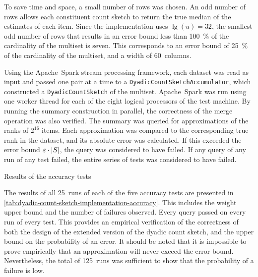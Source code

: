 To save time and space, a small number of rows was chosen.
An odd number of rows allows each constituent count sketch to return the true median of the estimates of each item.
Since the implementation uses \( \lg (u) = 32 \), the smallest odd number of rows that results in an error bound less than \SI{100}{\percent} of the cardinality of the multiset is seven.
This corresponds to an error bound of \SI{25}{\percent} of the cardinality of the multiset, and a width of \num{60}~columns.

Using the Apache~Spark stream processing framework, each dataset was read as input and passed one pair at a time to a \lstinline{DyadicCountSketchAccumulator}, which constructed a \lstinline{DyadicCountSketch} of the multiset.
Apache~Spark was run using one worker thread for each of the eight logical processors of the test machine.
By running the summary construction in parallel, the correctness of the merge operation was also verified.
The summary was queried for approximations of the ranks of \( 2^{16} \) items.
Each approximation was compared to the corresponding true rank in the dataset, and its absolute error was calculated.
If this exceeded the error bound \( \varepsilon \cdot \lvert S\rvert \), the query was considered to have failed.
If any query of any run of any test failed, the entire series of tests was considered to have failed.

\begin{table}
  \centering
  \caption{Results of the accuracy tests}
  \label{tab:dyadic-count-sketch-implementation-accuracy}
\end{table}

The results of all \num{25}~runs of each of the five accuracy tests are presented in \cref{tab:dyadic-count-sketch-implementation-accuracy}.
This includes the weight upper bound and the number of failures observed.
Every query passed on every run of every test.
This provides an empirical verification of the correctness of both the design of the extended version of the dyadic count sketch, and the upper bound on the probability of an error.
It should be noted that it is impossible to prove empirically that an approximation will never exceed the error bound.
Nevertheless, the total of \num{125}~runs was sufficient to show that the probability of a failure is low.

